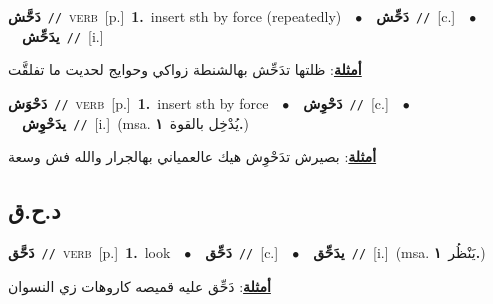\documentclass[10pt,a4paper,twoside]{article} %
\begin{document}
\begin{multicols}{2}
{\setlength\topsep{0pt}\textbf{\foreignlanguage{arabic}{دَحَّش}}\ {\color{gray}\texttt{//}\color{black}}\ \textsc{verb}\ [p.]\ \textbf{1.}~insert sth by force (repeatedly)\ \ $\bullet$\ \ \setlength\topsep{0pt}\textbf{\foreignlanguage{arabic}{دَحِّش}}\ {\color{gray}\texttt{//}\color{black}}\ [c.]\ \ $\bullet$\ \ \setlength\topsep{0pt}\textbf{\foreignlanguage{arabic}{يدَحِّش}}\ {\color{gray}\texttt{//}\color{black}}\ [i.]\  \begin{flushright}\color{gray}\foreignlanguage{arabic}{\textbf{\underline{\foreignlanguage{arabic}{أمثلة}}}: ظلتها تدَحِّش بهالشنطة زواكي وحوايج لحديت ما تفلقَّت}\end{flushright}\color{black}} \vspace{2mm}

{\setlength\topsep{0pt}\textbf{\foreignlanguage{arabic}{دَحْوَش}}\ {\color{gray}\texttt{//}\color{black}}\ \textsc{verb}\ [p.]\ \textbf{1.}~insert sth by force\ \ $\bullet$\ \ \setlength\topsep{0pt}\textbf{\foreignlanguage{arabic}{دَحْوِش}}\ {\color{gray}\texttt{//}\color{black}}\ [c.]\ \ $\bullet$\ \ \setlength\topsep{0pt}\textbf{\foreignlanguage{arabic}{يدَحْوِش}}\ {\color{gray}\texttt{//}\color{black}}\ [i.]\ \color{gray}(msa. \foreignlanguage{arabic}{يُدْخِل بالقوة}~\foreignlanguage{arabic}{\textbf{١.}})\color{black}\  \begin{flushright}\color{gray}\foreignlanguage{arabic}{\textbf{\underline{\foreignlanguage{arabic}{أمثلة}}}: بصيرش تدَحْوِش هيك عالعمياني بهالجرار والله فش وسعة}\end{flushright}\color{black}} \vspace{2mm}

\vspace{-3mm}
\subsection*{\color{blue}\foreignlanguage{arabic}{د.ح.ق}\color{blue}{}} 

{\setlength\topsep{0pt}\textbf{\foreignlanguage{arabic}{دَحَّق}}\ {\color{gray}\texttt{//}\color{black}}\ \textsc{verb}\ [p.]\ \textbf{1.}~look\ \ $\bullet$\ \ \setlength\topsep{0pt}\textbf{\foreignlanguage{arabic}{دَحِّق}}\ {\color{gray}\texttt{//}\color{black}}\ [c.]\ \ $\bullet$\ \ \setlength\topsep{0pt}\textbf{\foreignlanguage{arabic}{يدَحِّق}}\ {\color{gray}\texttt{//}\color{black}}\ [i.]\ \color{gray}(msa. \foreignlanguage{arabic}{يَنْظُر}~\foreignlanguage{arabic}{\textbf{١.}})\color{black}\  \begin{flushright}\color{gray}\foreignlanguage{arabic}{\textbf{\underline{\foreignlanguage{arabic}{أمثلة}}}: دَحِّق عليه قميصه كاروهات زي النسوان}\end{flushright}\color{black}} \vspace{2mm}


\end{multicols}
\end{document}
